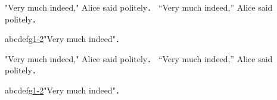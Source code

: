 "Very much indeed," Alice said politely． %
``Very much indeed,'' Alice said politely． %

abcdefg\url{1-2}"Very much indeed"．%

"Very much indeed," Alice said politely． %
``Very much indeed,'' Alice said politely． %

abcdefg\url{1-2}"Very much indeed"．%